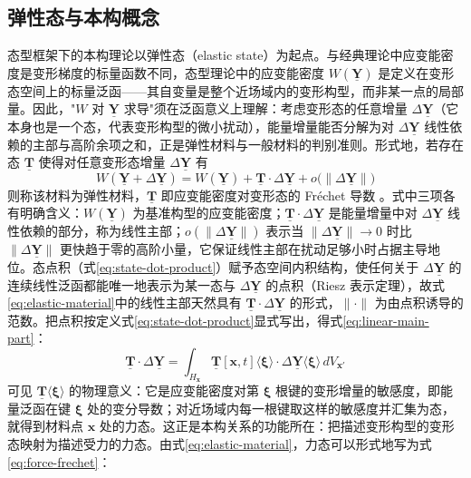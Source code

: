 \subsection{弹性态与本构概念}\label{sec:elastic-states}

态型框架下的本构理论以弹性态（elastic state）为起点。与经典理论中应变能密度是变形梯度的标量函数不同，态型理论中的应变能密度 $W(\underline{\mathbf{Y}})$ 是定义在变形态空间上的标量泛函——其自变量是整个近场域内的变形构型，而非某一点的局部量。因此，"$W$ 对 $\underline{\mathbf{Y}}$ 求导"须在泛函意义上理解：考虑变形态的任意增量 $\Delta\underline{\mathbf{Y}}$（它本身也是一个态，代表变形构型的微小扰动），能量增量能否分解为对 $\Delta\underline{\mathbf{Y}}$ 线性依赖的主部与高阶余项之和，正是弹性材料与一般材料的判别准则。形式地，若存在态 $\underline{\mathbf{T}}$ 使得对任意变形态增量 $\Delta\underline{\mathbf{Y}}$ 有
\begin{equation}
  W(\underline{\mathbf{Y}}+\Delta\underline{\mathbf{Y}})=W(\underline{\mathbf{Y}})+\underline{\mathbf{T}}\cdot\Delta\underline{\mathbf{Y}}+o\bigl(\|\Delta\underline{\mathbf{Y}}\|\bigr)
  \label{eq:elastic-material}
\end{equation}
则称该材料为弹性材料，$\underline{\mathbf{T}}$ 即应变能密度对变形态的 Fréchet 导数 \cite{Silling2007}。式中三项各有明确含义：$W(\underline{\mathbf{Y}})$ 为基准构型的应变能密度；$\underline{\mathbf{T}}\cdot\Delta\underline{\mathbf{Y}}$ 是能量增量中对 $\Delta\underline{\mathbf{Y}}$ 线性依赖的部分，称为线性主部；$o(\|\Delta\underline{\mathbf{Y}}\|)$ 表示当 $\|\Delta\underline{\mathbf{Y}}\|\to 0$ 时比 $\|\Delta\underline{\mathbf{Y}}\|$ 更快趋于零的高阶小量，它保证线性主部在扰动足够小时占据主导地位。态点积（式\eqref{eq:state-dot-product}）赋予态空间内积结构，使任何关于 $\Delta\underline{\mathbf{Y}}$ 的连续线性泛函都能唯一地表示为某一态与 $\Delta\underline{\mathbf{Y}}$ 的点积（Riesz 表示定理），故式\eqref{eq:elastic-material}中的线性主部天然具有 $\underline{\mathbf{T}}\cdot\Delta\underline{\mathbf{Y}}$ 的形式，$\|\cdot\|$ 为由点积诱导的范数。把点积按定义式\eqref{eq:state-dot-product}显式写出，得式\eqref{eq:linear-main-part}：
\begin{equation}
  \underline{\mathbf{T}}\cdot\Delta\underline{\mathbf{Y}}=
  \int_{H_{\mathbf{x}}}\underline{\mathbf{T}}[\mathbf{x},t]\langle\boldsymbol{\xi}\rangle\cdot
  \Delta\underline{\mathbf{Y}}\langle\boldsymbol{\xi}\rangle\,dV_{\mathbf{x}'}
  \label{eq:linear-main-part}
\end{equation}
可见 $\underline{\mathbf{T}}\langle\boldsymbol{\xi}\rangle$ 的物理意义：它是应变能密度对第 $\boldsymbol{\xi}$ 根键的变形增量的敏感度，即能量泛函在键 $\boldsymbol{\xi}$ 处的变分导数；对近场域内每一根键取这样的敏感度并汇集为态，就得到材料点 $\mathbf{x}$ 处的力态。这正是本构关系的功能所在：把描述变形构型的变形态映射为描述受力的力态。由式\eqref{eq:elastic-material}，力态可以形式地写为式\eqref{eq:force-frechet}：

